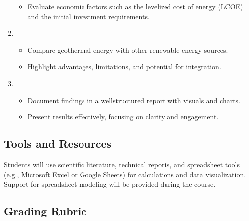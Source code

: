 \documentclass[letterpaper,10pt,english]{jupyterBook}
\begin{document}
\begin{enumerate}
\begin{itemize}
\item {} 
\sphinxAtStartPar
Evaluate economic factors such as the levelized cost of energy (LCOE) and the initial investment requirements.

\end{itemize}

\item {} 
\sphinxAtStartPar
{}
\begin{itemize}
\item {} 
\sphinxAtStartPar
Compare geothermal energy with other renewable energy sources.

\item {} 
\sphinxAtStartPar
Highlight advantages, limitations, and potential for integration.

\end{itemize}

\item {} 
\sphinxAtStartPar
{}
\begin{itemize}
\item {} 
\sphinxAtStartPar
Document findings in a well\sphinxhyphen{}structured report with visuals and charts.

\item {} 
\sphinxAtStartPar
Present results effectively, focusing on clarity and engagement.

\end{itemize}

\end{enumerate}


\subsection{Tools and Resources}
\label{\detokenize{ProjectSyllabus:id20}}
\sphinxAtStartPar
Students will use scientific literature, technical reports, and spreadsheet tools (e.g., Microsoft Excel or Google Sheets) for calculations and data visualization. Support for spreadsheet modeling will be provided during the course.


\subsection{Grading Rubric}
\label{\detokenize{ProjectSyllabus:id21}}
\end{document}
